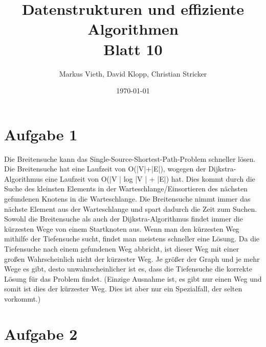 \documentclass[a4paper,11pt,twoside]{article}
\title{Datenstrukturen und effiziente Algorithmen\\ Blatt 10}
\author{Markus Vieth, David Klopp, Christian Stricker}
\date{\today}
\begin{document}
\maketitle
\cleardoublepage
\pagestyle{myheadings}

\section*{Aufgabe 1}

Die Breitensuche kann das Single-Source-Shortest-Path-Problem schneller lösen. Die Breitensuche hat eine Laufzeit von O(|V|+|E|), wogegen der Dijkstra-Algorithmus eine Laufzeit von O(|V | log |V | + |E|) hat. Dies kommt durch die Suche des kleinsten Elements in der Warteschlange/Einsortieren des nächsten gefundenen Knotens in die Warteschlange. Die Breitensuche nimmt immer das nächste Element aus der Warteschlange und spart dadurch die Zeit zum Suchen. Sowohl die Breitensuche als auch der Dijkstra-Algorithmus findet immer die kürzesten Wege von einem Startknoten aus.
Wenn man den kürzesten Weg mithilfe der Tiefensuche sucht, findet man meistens schneller eine Lösung. Da die Tiefensuche nach einem gefundenen Weg abbricht, ist dieser Weg mit einer großen Wahrscheinlich nicht der kürzester Weg. Je größer der Graph und je mehr Wege es gibt, desto unwahrscheinlicher ist es, dass die Tiefensuche die korrekte Lösung für das Problem findet. (Einzige Ausnahme ist, es gibt nur einen Weg und somit ist dies der kürzester Weg. Dies ist aber nur ein Spezialfall, der selten vorkommt.) 

\newpage
 
\section*{Aufgabe 2}
\end{document}
